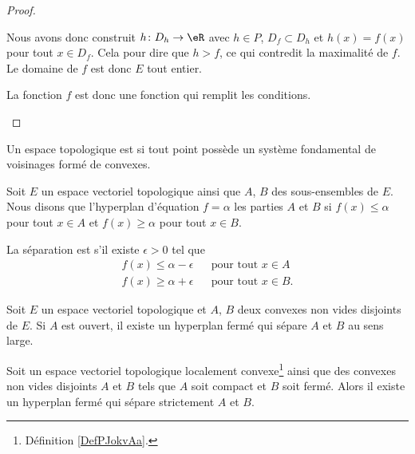 \begin{proof}
\begin{subproof}
        Nous avons donc construit \( h\colon D_h\to \eR\) avec \( h\in P\), \( D_f\subset D_h\) et \( h(x)=f(x)\) pour tout \( x\in D_f\). Cela pour dire que \( h>f\), ce qui contredit la maximalité de \( f\). Le domaine de \( f\) est donc \( E\) tout entier.

        La fonction \( f\) est donc une fonction qui remplit les conditions.

    \end{subproof}
\end{proof}

\begin{definition}  \label{DefPJokvAa}
    Un espace topologique est  si tout point possède un système fondamental de voisinages formé de convexes.
\end{definition}

\begin{definition}
    Soit \( E\) un espace vectoriel topologique ainsi que \( A\), \( B\) des sous-ensembles de \( E\). Nous disons que l'hyperplan d'équation \( f=\alpha\)  les parties \( A\) et \( B\) si \( f(x)\leq \alpha\) pour tout \( x\in A\) et \( f(x)\geq \alpha\) pour tout \( x\in B\).

    La séparation est  s'il existe \( \epsilon>0\) tel que 
    \begin{subequations}
        \begin{align}
            f(x)\leq \alpha-\epsilon&&\text{pour tout } x\in A\\
            f(x)\geq \alpha+\epsilon&&\text{pour tout } x\in B.
        \end{align}
    \end{subequations}
\end{definition}

\begin{theorem}  \label{ThoSAJjdZc}
    Soit \( E\) un espace vectoriel topologique et \( A\), \( B\) deux convexes non vides disjoints de \( E\). Si \( A\) est ouvert, il existe un hyperplan fermé qui sépare \( A\) et \( B\) au sens large.
\end{theorem}

\begin{theorem} \label{ThoACuKgtW}
    Soit un espace vectoriel topologique localement convexe\footnote{Définition \ref{DefPJokvAa}.} ainsi que des convexes non vides disjoints \( A\) et \( B\) tels que \( A\) soit compact et \( B\) soit fermé. Alors il existe un hyperplan fermé qui sépare strictement \( A\) et \( B\).
\end{theorem}

